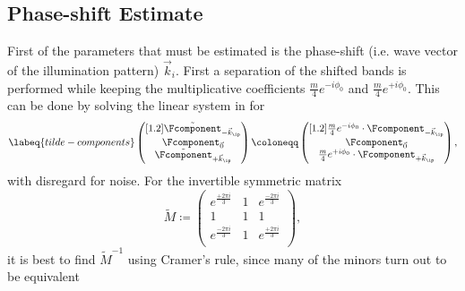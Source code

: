 \subsection{Phase-shift Estimate}
First of the parameters that must be estimated is the phase-shift (i.e. wave vector of the illumination pattern) 
    \(\vec{k}_i\).
First a separation of the shifted bands is performed while keeping the multiplicative coefficients \(\frac{m}{4} e^{-i\phi_0}\) and 
    \(\frac{m}{4} e^{+i\phi_0}\).
This can be done by solving the linear system in  for 
    \begin{equation}
        \labeq{tilde-components}
        \begin{pmatrix}[1.2]
            \tilde{\Fcomponent}_{-\vec{k}_\ip} \\
            \Fcomponent_{\vec{0}} \\
            \tilde{\Fcomponent}_{+\vec{k}_\ip} \\
        \end{pmatrix} \coloneqq
        \begin{pmatrix}[1.2]
            \frac{m}{4}  e^{-i\phi_0} \cdot \Fcomponent_{-\vec{k}_\ip} \\
            \Fcomponent_{\vec{0}} \\
        \frac{m}{4} e^{+i\phi_0} \cdot\Fcomponent_{+\vec{k}_\ip} \\
    \end{pmatrix},
    \end{equation}
    with disregard for noise.
For the invertible symmetric matrix
    \begin{equation*}
        \tilde{M} \coloneqq \begin{pmatrix}
            e^{\frac{+2\pi i}{3}}             & 1 & e^{\frac{-2\pi i}{3}} \\
            1 & 1 &  1\\
            e^{\frac{-2\pi i}{3}}             & 1 & e^{\frac{+2\pi i}{3}} \\
        \end{pmatrix},
    \end{equation*}
    it is best to find \(\tilde{M}^{-1}\) using Cramer's rule, since many of the minors turn out to be equivalent
